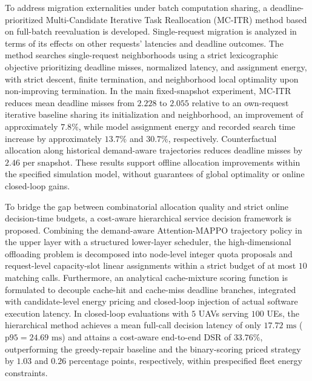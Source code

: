 \begin{abstract*}
To address migration externalities under batch computation sharing, a deadline-prioritized Multi-Candidate Iterative Task Reallocation (MC-ITR) method based on full-batch reevaluation is developed. Single-request migration is analyzed in terms of its effects on other requests' latencies and deadline outcomes. The method searches single-request neighborhoods using a strict lexicographic objective prioritizing deadline misses, normalized latency, and assignment energy, with strict descent, finite termination, and neighborhood local optimality upon non-improving termination. In the main fixed-snapshot experiment, MC-ITR reduces mean deadline misses from $2.228$ to $2.055$ relative to an own-request iterative baseline sharing its initialization and neighborhood, an improvement of approximately $7.8\%$, while model assignment energy and recorded search time increase by approximately $13.7\%$ and $30.7\%$, respectively. Counterfactual allocation along historical demand-aware trajectories reduces deadline misses by $2.46$ per snapshot. These results support offline allocation improvements within the specified simulation model, without guarantees of global optimality or online closed-loop gains.

To bridge the gap between combinatorial allocation quality and strict online decision-time budgets, a cost-aware hierarchical service decision framework is proposed. Combining the demand-aware Attention-MAPPO trajectory policy in the upper layer with a structured lower-layer scheduler, the high-dimensional offloading problem is decomposed into node-level integer quota proposals and request-level capacity-slot linear assignments within a strict budget of at most $10$ matching calls. Furthermore, an analytical cache-mixture scoring function is formulated to decouple cache-hit and cache-miss deadline branches, integrated with candidate-level energy pricing and closed-loop injection of actual software execution latency. In closed-loop evaluations with $5$ UAVs serving $100$ UEs, the hierarchical method achieves a mean full-call decision latency of only $17.72\text{ ms}$ ($\text{p95} = 24.69\text{ ms}$) and attains a cost-aware end-to-end DSR of $33.76\%$, outperforming the greedy-repair baseline and the binary-scoring priced strategy by $1.03$ and $0.26$ percentage points, respectively, within prespecified fleet energy constraints.
\end{abstract*}
